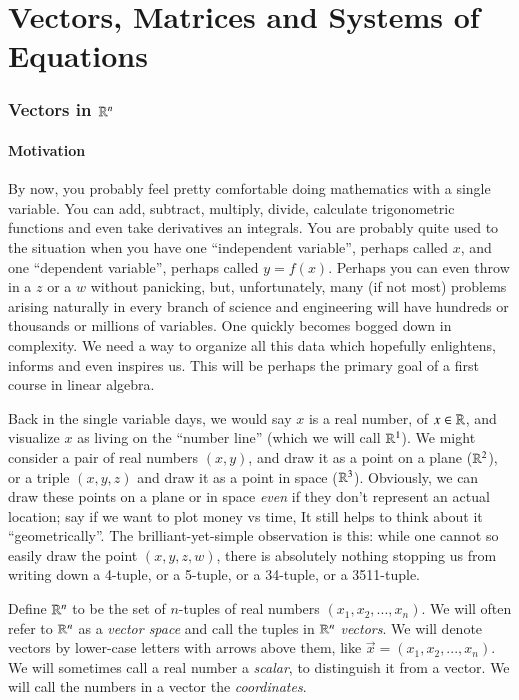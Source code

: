 \documentclass[Main.tex]{subfiles}
\begin{document}
\part{Vectors, Matrices and Systems of Equations}
\newpage
\section{Vectors in $\mathbb{R}^n$}

\subsection{Motivation}

By now, you probably feel pretty comfortable doing mathematics with a single variable.
You can add, subtract, multiply, divide, calculate trigonometric functions and even take derivatives an integrals.  
You are probably quite used to the situation when you have one ``independent variable'', perhaps called $x$, and one ``dependent variable'', perhaps called $y=f(x)$.  
Perhaps you can even throw in a $z$ or a $w$ without panicking, but, unfortunately, many (if not most) problems arising naturally in every branch of science and engineering will have hundreds or thousands or millions of variables.  
One quickly becomes bogged down in complexity.
We need a way to organize all this data which hopefully enlightens, informs and even inspires us.
This will be perhaps the primary goal of a first course in linear algebra.  

Back in the single variable days, we would say $x$ is a real number, of $x\in \mathbb{R}$, and visualize $x$ as living on the ``number line'' (which we will call $\mathbb{R}^1$). 
We might consider a pair of real numbers $(x,y)$, and draw it as a point on a plane ($\mathbb{R}^2$), or a triple $(x,y,z)$ and draw it as a point in space ($\mathbb{R}^3$).  
Obviously, we can draw these points on a plane or in space \emph{even} if they don't represent an actual location; say if we want to plot money vs time, 
It still helps to think about it ``geometrically''.  
The brilliant-yet-simple observation is this:  
while one cannot so easily draw the point $(x,y,z,w)$, there is absolutely nothing stopping us from writing down a 4-tuple, or a 5-tuple, or a 34-tuple, or a 3511-tuple.

\begin{Def}
  Define $\mathbb{R}^n$ to be the set of $n$-tuples of real numbers $(x_1,x_2,...,x_n)$.  
  We will often refer to $\mathbb{R}^n$ as a \emph{vector space} and call the tuples in $\mathbb{R}^n$ \emph{vectors}.  
  We will denote vectors by lower-case letters with arrows above them, like $\vec{x}=(x_1,x_2,...,x_n)$.  
  We will sometimes call a real number a \emph{scalar}, to distinguish it from a vector.  
  We will call the numbers in a vector the \emph{coordinates}.  
\end{Def}
\end{document}
